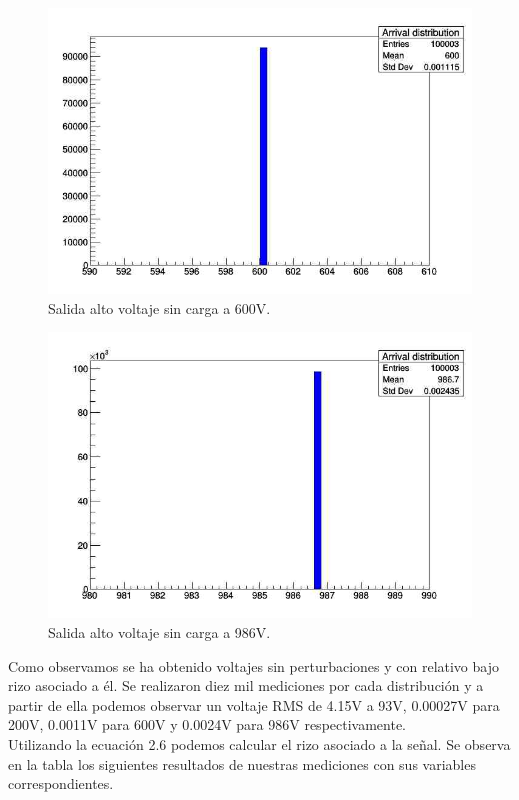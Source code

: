 \begin{figure}[H]
\centering
\includegraphics[width=12cm]{Capitulo4/600v.jpg}
\caption{Salida alto voltaje sin carga a 600V.}
\end{figure}

\begin{figure}[H]
\centering
\includegraphics[width=12cm]{Capitulo4/986v.jpg}
\caption{Salida alto voltaje sin carga a 986V.}
\end{figure}
\newpage

Como observamos se ha obtenido voltajes sin perturbaciones y con relativo bajo rizo asociado a él. Se realizaron diez mil mediciones por cada distribución y a partir de ella podemos observar un voltaje RMS de 4.15V a 93V, 0.00027V para 200V, 0.0011V para 600V y 0.0024V para 986V respectivamente. \\

Utilizando la ecuación 2.6 podemos calcular el rizo asociado a la señal. Se observa en la tabla los siguientes resultados de nuestras mediciones con sus variables correspondientes. 

